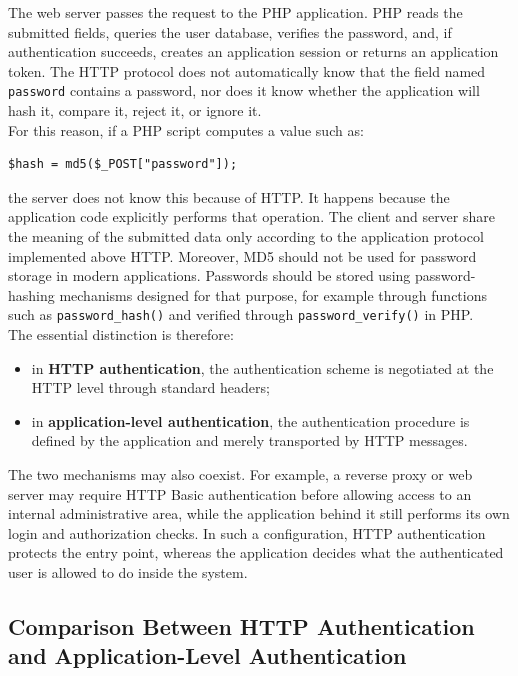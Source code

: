 \documentclass{scrbook}
\begin{document}
The web server passes the request to the PHP application. PHP reads the submitted fields, queries the user database, verifies the password, and, if authentication succeeds, creates an application session or returns an application token. The HTTP protocol does not automatically know that the field named \texttt{password} contains a password, nor does it know whether the application will hash it, compare it, reject it, or ignore it.\\

For this reason, if a PHP script computes a value such as:

\begin{lstlisting}
$hash = md5($_POST["password"]);
\end{lstlisting}

the server does not know this because of HTTP. It happens because the application code explicitly performs that operation. The client and server share the meaning of the submitted data only according to the application protocol implemented above HTTP. Moreover, MD5 should not be used for password storage in modern applications. Passwords should be stored using password-hashing mechanisms designed for that purpose, for example through functions such as \texttt{password\_hash()} and verified through \texttt{password\_verify()} in PHP.\\

The essential distinction is therefore:

\begin{itemize}
	\item in \textbf{HTTP authentication}, the authentication scheme is negotiated at the HTTP level through standard headers;
	\item in \textbf{application-level authentication}, the authentication procedure is defined by the application and merely transported by HTTP messages.
\end{itemize}

The two mechanisms may also coexist. For example, a reverse proxy or web server may require HTTP Basic authentication before allowing access to an internal administrative area, while the application behind it still performs its own login and authorization checks. In such a configuration, HTTP authentication protects the entry point, whereas the application decides what the authenticated user is allowed to do inside the system.

\subsection{Comparison Between HTTP Authentication and Application-Level Authentication}
\end{document}
